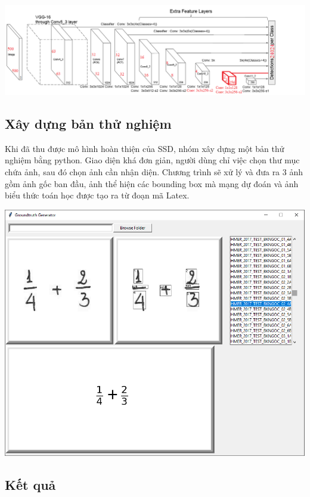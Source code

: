 \documentclass[a4paper]{article}
\theoremstyle{definition}
\begin{document}
	\begin{center}
		\centering
		\includegraphics[width=0.875\linewidth]{SSD_Struture_5.png}
		\vspace{0.5cm}
	\end{center}
	
	\subsection{Xây dựng bản thử nghiệm}
	
	Khi đã thu được mô hình hoàn thiện của SSD, nhóm xây dựng một bản thử nghiệm bằng python. Giao diện khá đơn giản, người dùng chỉ việc chọn thư mục chứa ảnh, sau đó chọn ảnh cần nhận diện. Chương trình sẽ xử lý và đưa ra 3 ảnh gồm ảnh gốc ban đầu, ảnh thể hiện các bounding box mà mạng dự đoán và ảnh biểu thức toán học được tạo ra từ đoạn mã Latex.
	
	\begin{center}
		
		\centering
		\includegraphics[width=0.8\linewidth]{demoImg.png}
		\vspace{0.5cm}
	\end{center}
	\subsection{Kết quả}
	
\end{document}
